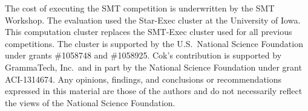 \documentclass[smallcondensed]{svjour3}
\begin{document}
\begin{acknowledgements} 
 
The cost of executing the SMT competition is underwritten by the SMT
Workshop.  The evaluation used the Star-Exec cluster at the University
of Iowa.  This computation cluster replaces the SMT-Exec cluster used
for all previous competitions.  The cluster is supported by the
U.S.\ National Science Foundation under grants \#1058748 and \#1058925.  Cok's
contribution is supported by GrammaTech, Inc.\ and in part by the
National Science Foundation under grant ACI-1314674.  Any opinions,
findings, and conclusions or recommendations expressed in this
material are those of the authors and do not necessarily reflect the
views of the National Science Foundation.
\end{acknowledgements}
 


\end{document}
